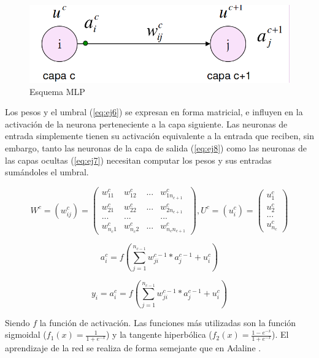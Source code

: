 \documentclass[11pt,spanish,listoffigures,listoftables]{workluis}
\begin{document}
\begin{figure}[H]
\centering
\includegraphics[scale=0.3]{mlpesquema}
\caption{Esquema MLP \cite{MLP}}\label{fig:esquema}
\end{figure}

\par Los pesos y el umbral (\ref{eq:ej6}) se expresan en forma matricial, e influyen en la activación de la neurona perteneciente a la capa siguiente. Las neuronas de entrada simplemente tienen su activación equivalente a la entrada que reciben, sin embargo, tanto las neuronas de la capa de salida (\ref{eq:ej8}) como las neuronas de las capas ocultas (\ref{eq:ej7}) necesitan computar los pesos y sus entradas sumándoles el umbral.

\begin{equation}\label{eq:ej6}
W^c = (w_{ij}^c) = \begin{pmatrix}
w_{11}^c & w_{12}^c & ... & w_{1n_{c+1}}^c\\ 
w_{21}^c & w_{22}^c & ... & w_{2n_{c+1}}^c\\ 
... & ... & & ...\\ 
w_{n_{c}1}^c & w_{n_{c}2}^c & ... & w_{n_{c}n_{c+1}}^c 
\end{pmatrix}  ,  U^c = (u_{i}^c) = \begin{pmatrix}
u_{1}^c\\ 
u_{2}^c\\ 
...\\ 
u_{n_{c}}^c 
\end{pmatrix}
\end{equation}

\begin{equation}\label{eq:ej7}
a_{i}^c = f(\sum_{j=1}^{n_{c-1}}w_{ji}^{c-1}*a_{j}^{c-1} + u_{i}^{c})
\end{equation} 

\begin{equation}\label{eq:ej8}
y_{i} = a_{i}^c = f(\sum_{j=1}^{n_{c-1}}w_{ji}^{c-1}*a_{j}^{c-1} + u_{i}^{c})
\end{equation} 

\par Siendo $f$ la función de activación. Las funciones más utilizadas son la función sigmoidal ($f_{1}(x) = \frac{1}{1+e^{-x}}$) y la tangente hiperbólica ($f_{2}(x) = \frac{1-e^{-x}}{1+e^{-x}}$). El aprendizaje de la red se realiza de forma semejante que en Adaline \cite{MLP}.
\end{document}
